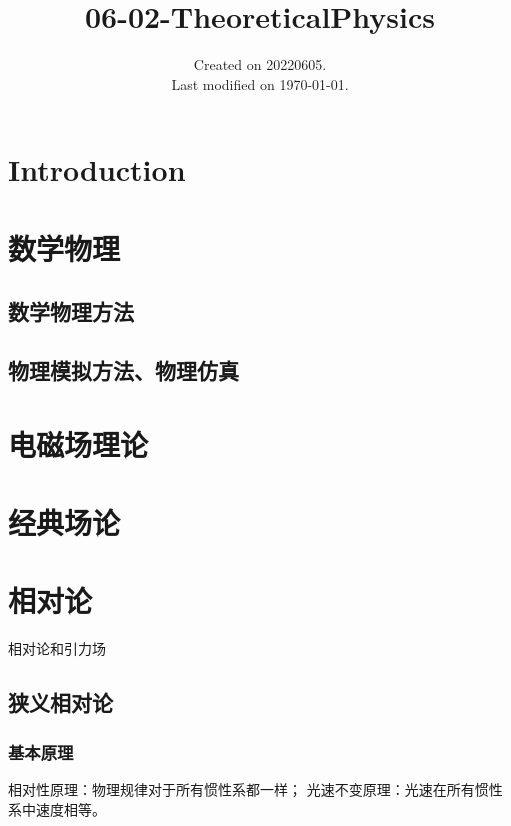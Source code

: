 \documentclass[UTF8]{../06-Physics}
\begin{document}
\title{06-02-TheoreticalPhysics}
\date{Created on 20220605.\\   Last modified on \today.}
\maketitle
\tableofcontents


\chapter{Introduction}


\chapter{数学物理}
    \section{数学物理方法}
    \section{物理模拟方法、物理仿真}






\chapter{电磁场理论}


\chapter{经典场论}





\chapter{相对论}

相对论和引力场

\section{狭义相对论}

\subsection{基本原理}
相对性原理：物理规律对于所有惯性系都一样；
光速不变原理：光速在所有惯性系中速度相等。
\end{document}
